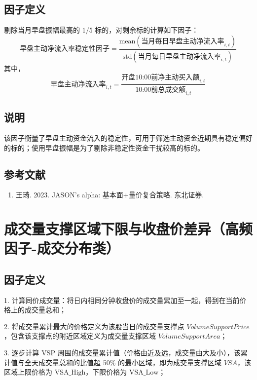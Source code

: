 \documentclass{article}
\begin{document}
\subsection{因子定义}
剔除当月早盘振幅最高的 \(1/5\) 标的，对剩余标的计算如下因子：
\begin{equation}
    \text{早盘主动净流入率稳定性因子}=\frac{\mathrm{mean}(\text{当月每日早盘主动净流入率}_{i,t})}{\mathrm{std}(\text{当月每日早盘主动净流入率}_{i,t})}
\end{equation}
其中，
\begin{equation}
    \text{早盘主动净流入率}_{i,t} = \frac{\text{开盘10:00前净主动买入额}_{i,t}}{\text{10:00前总成交额}_{i,t}}
\end{equation}

\subsection{说明}
该因子衡量了早盘主动资金流入的稳定性，可用于筛选主动资金近期具有稳定偏好的标的；使用早盘振幅是为了剔除非稳定性资金干扰较高的标的。

\subsection{参考文献}
\begin{enumerate}
    \item 王琦. 2023. JASON's alpha: 基本面+量价复合策略. 东北证券.
\end{enumerate}

\section{成交量支撑区域下限与收盘价差异（高频因子-成交分布类）}

\subsection{因子定义}

1. 计算同价成交量：将日内相同分钟收盘价的成交量累加至一起，得到在当前价格上的成交量总和；

2. 将成交量累计最大的价格定义为该股当日的成交量支撑点 \( VolumeSupportPrice \)，包含该支撑点的附近区域定义为成交量支撑区域 \( VolumeSupportArea \)；

3. 逐步计算 \( \mathrm{VSP} \) 周围的成交量累计值（价格由近及远，成交量由大及小），该累计值与全天成交量总和的比值超 50\% 的最小区域，即为成交量支撑区域 \( VSA \)，该区域上限价格为 \( \mathrm{VSA\_High} \)，下限价格为 \( \mathrm{VSA\_Low} \)；
\end{document}
